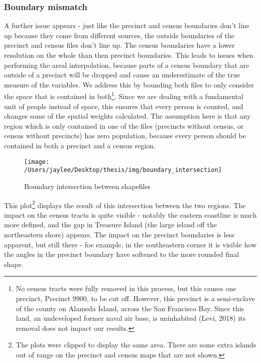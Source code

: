 \documentclass[12pt,twoside]{reedthesis}
\theoremstyle{definition}
\theoremstyle{definition}
\theoremstyle{definition}
\theoremstyle{remark}
\begin{document}
\hypertarget{boundary-mismatch}{%
\subsubsection{Boundary mismatch}\label{boundary-mismatch}}

A further issue appears - just like the precinct and census boundaries
don't line up because they come from different sources, the outside
boundaries of the precinct and census files don't line up. The census
boundaries have a lower resolution on the whole than then precinct
boundaries. This leads to issues when performing the areal
interpolation, because parts of a census boundary that are outside of a
precinct will be dropped and cause an underestimate of the true measure
of the variables. We address this by bounding both files to only
consider the space that is contained in both\footnote{No census tracts
  were fully removed in this process, but this causes one precinct,
  Precinct 9900, to be cut off. However, this precinct is a semi-exclave
  of the county on Alameda Island, across the San Francisco Bay. Since
  this land, an undeveloped former naval air base, is uninhabited (Levi,
  2018) its removal does not impact our results.}. Since we are dealing
with a fundamental unit of people instead of space, this ensures that
every person is counted, and changes some of the spatial weights
calculated. The assumption here is that any region which is only
contained in one of the files (precincts without census, or census
without precincts) has zero population, because every person should be
contained in both a precinct and a census region.
\begin{figure}
\texttt{[image: /Users/jaylee/Desktop/thesis/img/boundary\_intersection]} \caption{Boundary intersection between shapefiles}\label{fig:unnamed-chunk-7}
\end{figure}
This plot\footnote{The plots were clipped to display the same area.
  There are some extra islands out of range on the precinct and census
  maps that are not shown.} displays the result of this intersection
between the two regions. The impact on the census tracts is quite
visible - notably the eastern coastline is much more defined, and the
gap in Treasure Island (the large island off the northeastern shore)
appears. The impact on the precinct boundaries is less apparent, but
still there - foe example, in the southeastern corner it is visible how
the angles in the precinct boundary have softened to the more rounded
final shape.
\end{document}
